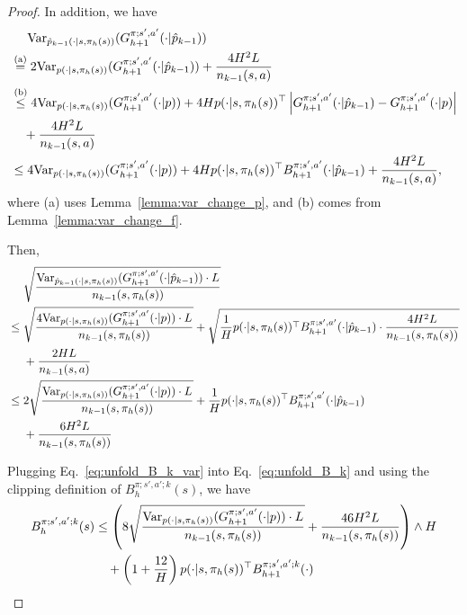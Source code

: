 \begin{proof}
	
	In addition, we have
	\begin{align*}
		&\quad\  \textup{Var}_{\hat{p}_{k-1}(\cdot|s,\pi_h(s))}(G^{\pi;s',a'}_{h+1}(\cdot|\hat{p}_{k-1})) \\
		&\overset{\textup{(a)}}{=} 2\textup{Var}_{p(\cdot|s,\pi_h(s))}(G^{\pi;s',a'}_{h+1}(\cdot|\hat{p}_{k-1})) + \frac{4H^2L}{n_{k-1}(s,a)}
		\\
		&\overset{\textup{(b)}}{\leq} 4\textup{Var}_{p(\cdot|s,\pi_h(s))}(G^{\pi;s',a'}_{h+1}(\cdot|p)) + 4H p(\cdot|s,\pi_h(s))^\top \left| G^{\pi;s',a'}_{h+1}(\cdot|\hat{p}_{k-1}) - G^{\pi;s',a'}_{h+1}(\cdot|p)  \right| \\& \quad + \frac{4H^2L}{n_{k-1}(s,a)} 
		\\
		&\leq 4\textup{Var}_{p(\cdot|s,\pi_h(s))}(G^{\pi;s',a'}_{h+1}(\cdot|p)) + 4H p(\cdot|s,\pi_h(s))^\top B^{\pi;s',a'}_{h+1}(\cdot|\hat{p}_{k-1}) + \frac{4H^2L}{n_{k-1}(s,a)} ,
	\end{align*}
	where (a) uses Lemma~\ref{lemma:var_change_p}, and (b) comes from Lemma~\ref{lemma:var_change_f}.
	
	Then,
	\begin{align}
		&\quad\ \sqrt{\frac{ \textup{Var}_{\hat{p}_{k-1}(\cdot|s,\pi_h(s))}(G^{\pi;s',a'}_{h+1}(\cdot|\hat{p}_{k-1})) \cdot L}{{n_{k-1}(s,\pi_h(s))}}} 
		\nonumber\\
		&\leq \sqrt{ \frac{4\textup{Var}_{p(\cdot|s,\pi_h(s))}(G^{\pi;s',a'}_{h+1}(\cdot|p)) \cdot L}{n_{k-1}(s,\pi_h(s))} } + \sqrt{ \frac{1}{H} p(\cdot|s,\pi_h(s))^\top B^{\pi;s',a'}_{h+1}(\cdot|\hat{p}_{k-1}) \cdot \frac{4H^2L}{n_{k-1}(s,\pi_h(s))} } 
		\nonumber\\ 
		&\quad\  + \frac{2HL}{n_{k-1}(s,a)}
		\nonumber\\
		&\leq 2\sqrt{ \frac{\textup{Var}_{p(\cdot|s,\pi_h(s))}(G^{\pi;s',a'}_{h+1}(\cdot|p)) \cdot L}{n_{k-1}(s,\pi_h(s))} } + \frac{1}{H} p(\cdot|s,\pi_h(s))^\top B^{\pi;s',a'}_{h+1}(\cdot|\hat{p}_{k-1}) 
		\nonumber\\ 
		&\quad\ + \frac{6H^2L}{n_{k-1}(s,\pi_h(s))} \label{eq:unfold_B_k_var} 
	\end{align}
	
	Plugging Eq.~\eqref{eq:unfold_B_k_var} into Eq.~\eqref{eq:unfold_B_k} and using the clipping definition of $B^{\pi;s',a';k}_h(s)$, we have
	\begin{align*}
		B^{\pi;s',a';k}_h(s) &\leq \left(  8\sqrt{ \frac{\textup{Var}_{p(\cdot|s,\pi_h(s))}(G^{\pi;s',a'}_{h+1}(\cdot|p)) \cdot L}{n_{k-1}(s,\pi_h(s))} }  + \frac{46H^2L}{n_{k-1}(s,\pi_h(s))}  \right) \wedge H 
		\\
		&\quad + \left( 1+\frac{12}{H} \right) p(\cdot|s,\pi_h(s))^\top B^{\pi;s',a';k}_{h+1}(\cdot)
	\end{align*}
	

\end{proof}
